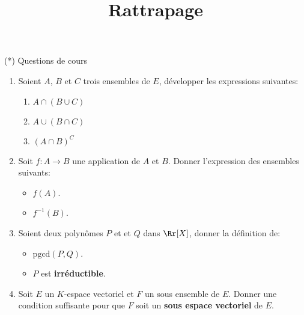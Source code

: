 \documentclass[exam]{cs188}
\title{Rattrapage}
\begin{document}
\newpage

\begin{problem}[5]{(*) Questions de cours}
    \begin{enumerate}
        \item Soient $A$, $B$ et $C$ trois ensembles de $E$, développer les expressions suivantes:
        \begin{enumerate}
            \item $A\cap( B \cup C)$
            \item $A \cup( B \cap C)$ 
            \item $\left( A \cap B\right)^C$
        \end{enumerate}
    \item Soit $f:A\longrightarrow B$ une application de $A$ et $B$. Donner
        l'expression des ensembles suivants:
        \begin{itemize}
            \item $f(A)$.
            \item $f^{-1}(B)$.
        \end{itemize}

    \item Soient deux polynômes $P$ et et $Q$ dans $\Rr[X]$, donner la
        définition de:

        \begin{itemize}
            \item $\text{pgcd}(P, Q)$.
            \item $P$ est \textbf{irréductible}.
        \end{itemize}

\item Soit $E$ un $K$-espace vectoriel  et $F$ un sous ensemble de $E$. Donner
    une condition  suffisante pour que $F$ soit un \textbf{sous espace
    vectoriel}  de $E$.
    \end{enumerate}
\end{problem}
\end{document}
